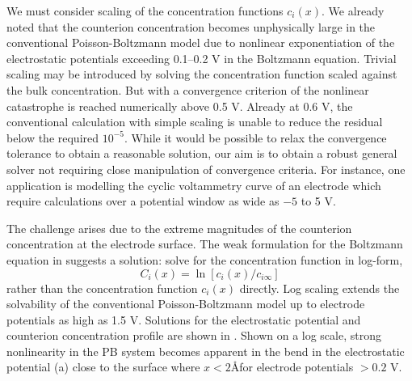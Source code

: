 We must consider scaling of the concentration functions $c_i(x)$. We
already noted that the counterion concentration becomes unphysically
large in the conventional Poisson-Boltzmann model due to nonlinear
exponentiation of the electrostatic potentials exceeding 0.1--0.2 V in
the Boltzmann equation. Trivial scaling may be introduced by solving
the concentration function scaled against the bulk concentration. But
with a convergence criterion of the nonlinear catastrophe is reached
numerically above 0.5 V. Already at 0.6 V, the conventional
calculation with simple scaling is unable to reduce the residual below
the required $10^{-5}$. While it would be possible to relax the
convergence tolerance to obtain a reasonable solution, our aim is to
obtain a robust general solver not requiring close manipulation of
convergence criteria. For instance, one application is modelling the
cyclic voltammetry curve of an electrode which require calculations
over a potential window as wide as $-5$ to 5 V.

The challenge arises due to the extreme magnitudes of the counterion
concentration at the electrode surface. The weak formulation for the
Boltzmann equation in  suggests a solution:
solve for the concentration function in log-form,
\begin{equation}
C_{i}(x) = \ln[ c_{i}(x) / c_{i\infty}]
\label{log_scaling}
\end{equation}
rather than the concentration function $c_{i}(x)$ directly. Log
scaling extends the solvability of the conventional Poisson-Boltzmann
model up to electrode potentials as high as 1.5 V. Solutions for the
electrostatic potential and counterion concentration profile are shown
in . Shown on a log scale, strong
nonlinearity in the PB system becomes apparent in the bend in the
electrostatic potential (a) close to the
surface where $x<2$\AA for electrode potentials $> 0.2$ V.



